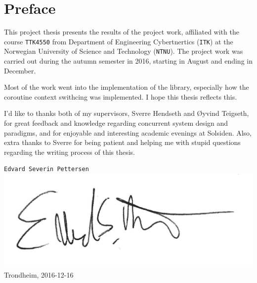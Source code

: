 
\newpage
{}
\section*{Preface}

This project thesis presents the results of the project work, affiliated with the course \texttt{TTK4550} from Department of Engineering Cybertnertics (\texttt{ITK}) at the Norwegian University of Science and Technology (\texttt{NTNU}). The project work was carried out during the autumn semester in 2016, starting in August and ending in December.

Most of the work went into the implementation of the library, especially how the coroutine context swithcing was implemented. I hope this thesis reflects this.

I'd like to thanks both of my supervisors, Sverre Hendseth and Øyvind Teigseth, for great feedback and knowledge regarding concurrent system design and paradigms, and for enjoyable and interesting academic evenings at Solsiden. Also, extra thanks to Sverre for being patient and helping me with stupid questions regarding the writing process of this thesis.\\[2cm]

\begin{flushright}
\texttt{Edvard Severin Pettersen}\\
\includegraphics[width=0.3\linewidth,right]{fig/signature}
Trondheim, 2016-12-16
\end{flushright}